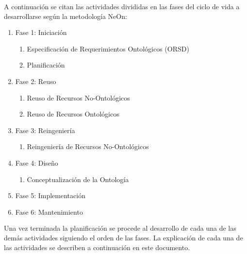 A continuación se citan las actividades divididas en las fases del ciclo de vida a desarrollarse según la metodología NeOn:
\begin{enumerate}
\item Fase 1: Iniciación
    \begin{enumerate}
    \item Especificación de Requerimientos Ontológicos (ORSD)
    \item Planificación 
    \end{enumerate}
\item Fase 2: Reuso
    \begin{enumerate}
    \item Reuso de Recursos No-Ontológicos
    \item Reuso de Recursos Ontológicos
    \end{enumerate}
\item Fase 3: Reingeniería
\begin{enumerate}
\item Reingeniería de Recursos No-Ontológicos
\end{enumerate}
\item Fase 4: Diseño
\begin{enumerate}
\item Conceptualización de la Ontología
\end{enumerate}
\item Fase 5: Implementación
\item Fase 6: Mantenimiento

\end{enumerate}
Una vez terminada la planificación se procede al desarrollo de cada una de las demás actividades siguiendo el orden de las fases. La explicación de cada una de las actividades se describen a continuación en este documento.
